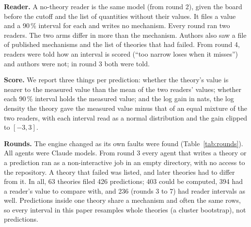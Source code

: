 \documentclass[10pt]{article}
\begin{document}
\textbf{Reader.} A no-theory reader is the same model (from round 2), given the board before the cutoff and the
list of quantities without their values. It files a value and a 90\,\% interval for each and writes no mechanism.
Every round ran two readers. The two arms differ in more than
the mechanism. Authors also saw a file of published mechanisms and the list of theories that had failed. From
round 4, readers were told how an interval is scored (``too narrow loses when it misses'') and authors were not;
in round 3 both were told.

\textbf{Score.} We report three things per prediction: whether the theory's value is nearer to the measured value
than the mean of the two readers' values; whether each 90\,\% interval holds the measured value; and the log gain
in nats, the log density the theory gave the measured value minus that of an equal mixture of the two readers,
with each interval read as a normal distribution and the gain clipped to $[-3, 3]$.

\textbf{Rounds.} The engine changed as its own faults were found (Table~\ref{tab:rounds}). All agents were Claude
models. From round 3 every agent that writes a theory or a prediction ran as a non-interactive job in an empty
directory, with no access to the repository. A theory that failed was listed, and later theories had to differ
from it. In all, 63 theories filed 426 predictions; 403 could be computed, 394 had a reader's value to compare
with, and 236 (rounds 3 to 7) had reader intervals as well. Predictions inside one theory share a mechanism and
often the same rows, so every interval in this paper resamples whole theories (a cluster bootstrap), not
predictions.
\end{document}
